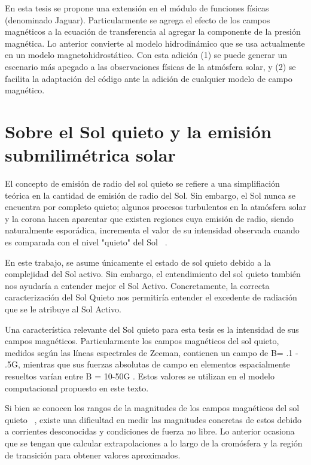 En esta tesis se propone una extensi\'on en el m\'odulo de funciones f\'isicas (denominado Jaguar). Particularmente se agrega el efecto de los campos magn\'eticos a la ecuaci\'on de transferencia al agregar la componente de la presi\'on magn\'etica. Lo anterior convierte al modelo hidrodin\'amico que se usa actualmente en un modelo magnetohidrost\'atico. Con esta adici\'on (1) se puede generar un escenario m\'as apegado a las observaciones f\'isicas de la atm\'osfera solar, y (2) se facilita la adaptaci\'on del c\'odigo ante la adici\'on de cualquier modelo de campo magn\'etico.



\section{Sobre el Sol quieto y la emisi\'on submilim\'etrica solar}

El concepto de emisión de radio del sol quieto se refiere a una simplifiación teórica en la cantidad de emisión de radio del Sol. Sin embargo, el Sol nunca se encuentra por completo quieto; algunos procesos turbulentos en la atm\'osfera solar y la corona hacen aparentar que existen regiones cuya emisi\'on de radio, siendo naturalmente espor\'adica, incrementa el valor de su intensidad observada cuando es comparada con el nivel "quieto" del Sol ~\citep{sol_quieto}.

En este trabajo, se asume \'unicamente el estado de sol quieto debido a la complejidad del Sol activo. Sin embargo, el entendimiento del sol quieto tambi\'en nos ayudar\'ia a entender mejor el Sol Activo. Concretamente, la correcta caracterizaci\'on del Sol Quieto nos permitir\'ia entender el excedente de radiaci\'on que se le atribuye al Sol Activo.

Una caracter\'istica relevante del Sol quieto para esta tesis es la intensidad de sus campos magn\'eticos. Particularmente los campos magn\'eticos del sol quieto, medidos seg\'un las l\'ineas espectrales de Zeeman, contienen un campo de B= .1 - .5G, mientras que sus fuerzas absolutas de campo en elementos espacialmente resueltos var\'ian entre B = 10-50G \citep{1000G}. Estos valores se utilizan en el modelo computacional propuesto en este texto.

Si bien se conocen los rangos de la magnitudes de los campos magn\'eticos del sol quieto ~\citep{VAULT2}, existe una dificultad en medir las magnitudes concretas de estos debido a corrientes desconocidas y condiciones de fuerza no libre. Lo anterior ocasiona que se tengan que calcular extrapolaciones a lo largo de la crom\'osfera y la regi\'on de transici\'on para obtener valores aproximados. 

